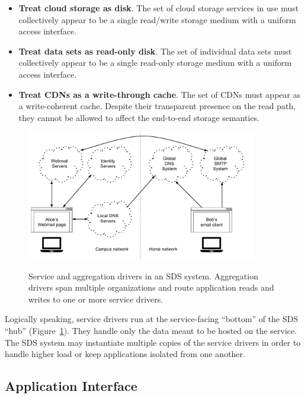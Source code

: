 \begin{itemize}
   \item \textbf{Treat cloud storage as disk}.  The set of cloud storage
      services in use must collectively appear to be a single
      read/write storage medium with a uniform access interface.
   \item \textbf{Treat data sets as read-only disk}.  The set of individual
      data sets must collectively appear to be a single read-only
      storage medium with a uniform access interface.
   \item \textbf{Treat CDNs as a write-through cache}.  The set of CDNs
      must appear as a write-coherent cache.  Despite their transparent presence
      on the read path, they cannot be allowed to affect the end-to-end storage
      semantics.
\end{itemize}


\begin{figure}[h]
   \caption{Service and aggregation drivers in an SDS system.  Aggregation
   drivers span multiple organizations and route application reads and writes to
   one or more service drivers.}
   \centering
   \includegraphics[width=0.9\textwidth,page=3]{figures/dissertation-figures}
   \label{fig:chap2-driver-overview}
\end{figure}

Logically speaking, service drivers run at the service-facing ``bottom'' of the
SDS ``hub'' (Figure~\ref{fig:chap2-driver-overview}).
They handle only the data meant to be hosted on the service.  The SDS system may
instantiate multiple copies of the service drivers in order to handle higher
load or keep applications isolated from one another.

\subsection{Application Interface}

